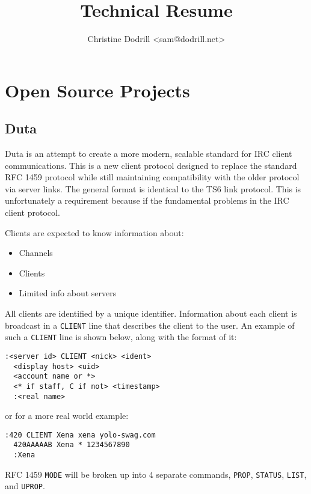 \documentclass[twocolumn]{article}
\title{Technical Resume}
\author{Christine Dodrill \textless{}sam@dodrill.net\textgreater{}}
\date{}
\begin{document}
\twocolumn[
 \begin{@twocolumnfalse}
  \maketitle
   \end{@twocolumnfalse}
]

\section{Open Source Projects}

\subsection{Duta}

Duta is an attempt to create a more modern, scalable standard for IRC client communications.  This is a new client protocol designed to replace the standard RFC 1459 protocol while still maintaining compatibility with the older protocol via server links. The general format is identical to the TS6 link protocol. This is unfortunately a requirement because if the fundamental problems in the IRC client protocol.

Clients are expected to know information about:

\begin{itemize}
	\item Channels
	\item Clients
	\item Limited info about servers
\end{itemize}

All clients are identified by a unique identifier. Information about each client is broadcast in a \texttt{CLIENT} line that describes the client to the user. An example of such a \texttt{CLIENT} line is shown below, along with the format of it:

\begin{verbatim}
:<server id> CLIENT <nick> <ident>
  <display host> <uid>
  <account name or *> 
  <* if staff, C if not> <timestamp> 
  :<real name>
\end{verbatim}

or for a more real world example:

\begin{verbatim}
:420 CLIENT Xena xena yolo-swag.com
  420AAAAAB Xena * 1234567890
  :Xena
\end{verbatim}

RFC 1459 \texttt{MODE} will be broken up into 4 separate commands, \texttt{PROP}, \texttt{STATUS}, \texttt{LIST}, and \texttt{UPROP}.
\end{document}
